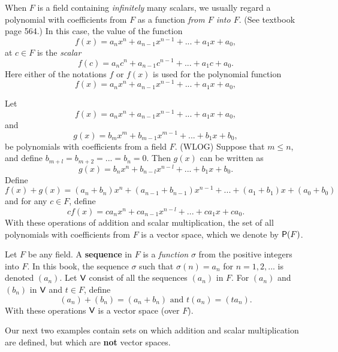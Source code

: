 \begin{note}
When \(F\) is a field containing \emph{infinitely} many scalars, we usually regard a polynomial with coefficients from \(F\) as a function \emph{from \(F\) into \(F\)}.
(See textbook page 564.)
In this case, the value of the function
\[
    f(x) = a_n x^n + a_{n - 1} x^{n - 1} + ... + a_1 x + a_0,
\]
at \(c \in F\) is the \emph{scalar}
\[
    f(c) = a_n c^n + a_{n - 1} c^{n - 1} + ... + a_1 c + a_0.
\]
Here either of the notations \(f\) or \(f(x)\) is used for the polynomial function
\[
    f(x) = a_n x^n + a_{n - 1} x^{n - 1} + ... + a_1 x + a_0,
\]
\end{note}

\begin{example} \label{example 1.2.4}
Let
\[
    f(x) = a_n x^n + a_{n - 1} x^{n - 1} + ... + a_1 x + a_0,
\]
and
\[
    g(x) = b_m x^m + b_{m - 1} x^{m - 1} + ... + b_1 x + b_0,
\]
be polynomials with coefficients from a field \(F\).
(WLOG) Suppose that \(m \le n\), and define \(b_{m+l} = b_{m+2} = ... = b_n = 0\).
Then \(g(x)\) can be written as
\[
    g(x) = b_n x^n + b_{n - l} x^{n - l} + ... + b_1 x + b_0.
\]
Define
\[
    f(x) + g(x) = (a_n + b_n) x^n + (a_{n - 1} + b_{n - 1}) x^{n - 1} + ... + (a_1 + b_1) x + (a_0 + b_0)
\]
and for any \(c \in F\), define
\[
    cf(x) = c {a_n} x^n + c a_{n-1} x^{n-l} + ... + c a_1 x + c a_0.
\]
With these operations of addition and scalar multiplication, the set of all polynomials with coefficients from \(F\) is a vector space, which we denote by \(\textsf{P}(F)\).
\end{example}

\begin{example} \label{example 1.2.5}
Let \(F\) be any field.
A \textbf{sequence} in \(F\) is a \emph{function} \(\sigma\) from the positive integers into \(F\).
In this book, the sequence \(\sigma\) such that \(\sigma(n) = a_n\) for \(n = 1, 2, ...\) is denoted \((a_n)\).
Let \(\textsf{V}\) consist of all the sequences \((a_n)\) in \(F\).
For \((a_n)\) and \((b_n)\) in \(\textsf{V}\) and \(t \in F\), define
\[
    (a_n) + (b_n) = (a_n + b_n) \text{ and } t(a_n) = (t a_n).
\]
With these operations \(\textsf{V}\) is a vector space (over \(F\)).
\end{example}

Our next two examples contain sets on which addition and scalar multiplication are defined, but which are \textbf{not} vector spaces.

